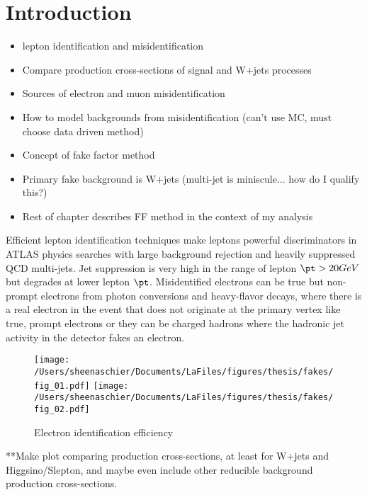 \section{Introduction}
\label{sec:FFintro}
\begin{itemize}
\item lepton identification and misidentification
\item Compare production cross-sections of signal and W+jets processes
\item Sources of electron and muon misidentification
\item How to model backgrounds from misidentification (can't use MC, must choose data driven method)
\item Concept of fake factor method
\item Primary fake background is W+jets (multi-jet is miniscule...  how do I qualify this?)
\item Rest of chapter describes FF method in the context of my analysis
\end{itemize}
Efficient lepton identification techniques make leptons powerful discriminators in ATLAS physics searches with large background rejection and heavily suppressed QCD multi-jets.  Jet suppression is very high in the range of lepton $\pt > 20 GeV$ but degrades at lower lepton $\pt$.  Misidentified electrons can be true but non-prompt electrons from photon conversions and heavy-flavor decays, where there is a real electron in the event that does not originate at the primary vertex like true, prompt electrons or they can be charged hadrons where the  hadronic jet activity in the detector fakes an electron.  
\begin{figure}[h!]
 \centering
 \texttt{[image: /Users/sheenaschier/Documents/LaFiles/figures/thesis/fakes/fig\_01.pdf]}
  \texttt{[image: /Users/sheenaschier/Documents/LaFiles/figures/thesis/fakes/fig\_02.pdf]}
 \caption{Electron identification efficiency}
 \label{fig:electronID}
 \end{figure}

**Make plot comparing production cross-sections, at least for W+jets and Higgsino/Slepton, and maybe even include other reducible background production cross-sections.
 \FloatBarrier
 
